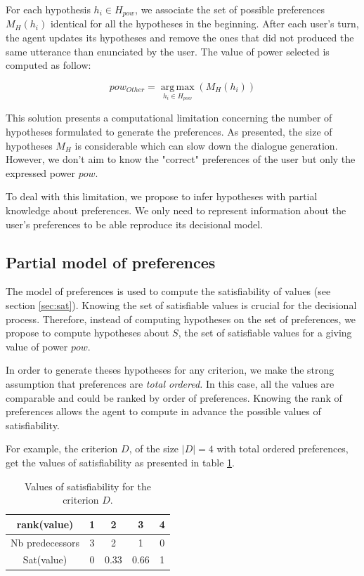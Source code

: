 \documentclass[sigconf]{aamas}  %
\begin{document}
	For each hypothesis $ h_i \in H_{pow}$, we associate the set of possible preferences $M_H(h_i)$ identical for all the hypotheses in the beginning. After each user's turn, the agent updates its hypotheses and remove the ones that did not produced the same utterance than enunciated by the user. The value of power selected is computed as follow:
	
	\begin{equation}
	pow_{Other} = \operatorname*{arg\,max}_{h_i \in H_{pow}} (M_H(h_i))
	\end{equation} 
	
	This solution presents a computational limitation concerning the number of hypotheses formulated to generate the preferences. As presented, the size of hypotheses $M_H$ is considerable which can slow down the dialogue generation. However, we don't aim to know the "correct" preferences of the user but only the expressed power $pow$. 
	
	To deal with this limitation, we propose to infer hypotheses with partial knowledge about preferences. We only need to represent information about the user's preferences to be able reproduce its decisional model. 
	
	
	
	\subsection{Partial model of preferences}
	
	The model of preferences is used to compute the satisfiability of values (see section \ref{sec:sat}). Knowing the set of satisfiable values is crucial for the decisional process. Therefore, instead of computing hypotheses on the set of preferences, we propose to compute hypotheses about $S$, the set of satisfiable values for a giving value of power $pow$.  
	
	\par In order to generate theses hypotheses for any criterion, we make the strong assumption that preferences are \emph{total ordered.} In this case, all the values are comparable and could be ranked by order of preferences. Knowing the rank of preferences allows the agent to compute in advance the possible values of satisfiability.
	
	For example, the criterion $D$, of the size  $|D| = 4$ with total ordered preferences, get the values of satisfiability as presented in table \ref{tab:poss}.
	\begin{table}[h]
		\centering
		\begin{tabular}{ |c|c|c|c|c| }
			\hline				
			rank(value) & 1 & 2 & 3 & 4 \\
			\hline
			Nb predecessors & 3 & 2 & 1& 0 \\
			\hline
			Sat(value) & 0 & 0.33 & 0.66 &1 \\
			\hline
			
		\end{tabular}
		\caption{Values of satisfiability for the criterion $D$.}
		\label{tab:poss}
	\end{table}
	
\end{document}

